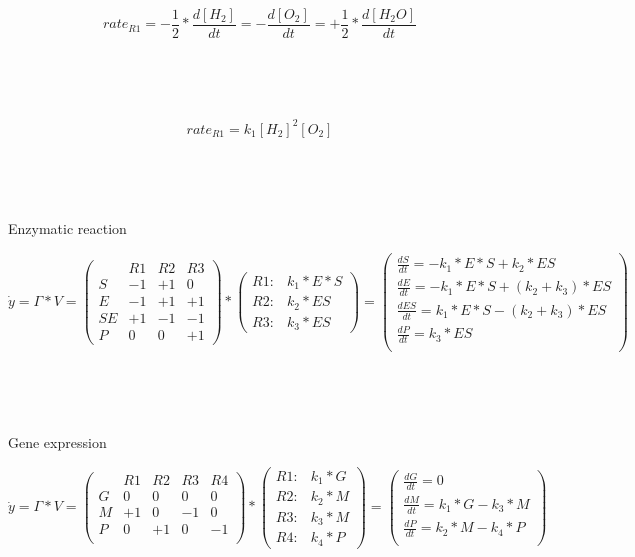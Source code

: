 \documentclass[11pt]{amsart}
\begin{document}
\[rate_{R1} = -\frac{1}{2}*\frac{d[H_2]}{dt}=-\frac{d[O_2]}{dt}=+\frac{1}{2}*\frac{d[H_2O]}{dt}\]

\

\

\[rate_{R1} = k_1[H_2]^2[O_2]\]

\

\

Enzymatic reaction

\[{\dot  {y}} 
 = \Gamma *V 
 =  \begin{pmatrix}
 & R1 & R2 & R3\\
S &  -1 & +1 & 0\\
E &  -1 & +1 & +1\\
SE &  +1 & -1 & -1\\
P &  0 & 0 & +1
\end{pmatrix} * 
\begin{pmatrix}
R1: & k_1*E*S\\
R2: & k_2*ES\\
R3: & k_3*ES
\end{pmatrix} 
=\left(
{\begin{array}{c}
{\frac  {dS}{dt}=  -k_1*E*S + k_2*ES}\\[6pt]
{\frac  {dE}{dt} = -k_1*E*S + (k_2+k_3)*ES}\\[6pt]
{\frac  {dES}{dt} =  k_1*E*S - (k_2+k_3)*ES}\\[6pt]
{\frac  {dP}{dt} = k_3*ES}\\[6pt] 
\end{array}}
\right)\]

\

\

Gene expression

\[{\dot  {y}} 
 = \Gamma *V 
 =  \begin{pmatrix}
 & R1 & R2 & R3 & R4\\
G & 0 & 0 & 0 & 0 \\
M & +1 & 0 & -1 & 0 \\
P &  0 & +1 & 0 & -1 \\ 
\end{pmatrix} * 
\begin{pmatrix}
R1: & k_1*G\\
R2: & k_2*M\\
R3: & k_3*M\\
R4: & k_4*P
\end{pmatrix} 
=\left(
{\begin{array}{c}
{\frac  {dG}{dt}=  0}\\[6pt]
{\frac  {dM}{dt} = k_1*G-k_3*M}\\[6pt]
{\frac  {dP}{dt} = k_2*M-k_4*P}\\[6pt] 
\end{array}}
\right)\]
\end{document}
